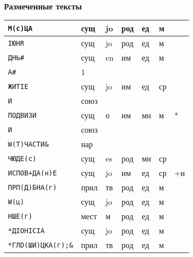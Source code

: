 \begin{frame}
  \frametitle{Размеченные тексты}

  \footnotesize \setlength{\aboverulesep}{0.5pt} \setlength{\belowrulesep}{0.5pt}
  \begin{tabularx}{\textwidth}{Xp{0.75cm}p{0.75cm}p{0.75cm}p{0.75cm}p{0.75cm}p{0.75cm}}
    \toprule
    \texttt{М(с)ЦА} & сущ  & jo & род & ед & м  &    \\ \midrule
    \texttt{IЮНR} & сущ  & jo & род & ед & м  &    \\ \midrule
    \texttt{ДНЬ\#} & сущ  & en & им  & ед & м  &    \\ \midrule
    \texttt{А\#} & 1    &    &     &    &    &    \\ \midrule
    \texttt{ЖИТIЕ} & сущ  & jo & им  & ед & ср &    \\ \midrule
    \texttt{И} & союз &    &     &    &    &    \\ \midrule
    \texttt{ПОДВИЗИ} & сущ  & о  & им  & мн & м  & *  \\ \midrule
    \texttt{И} & союз &    &     &    &    &    \\ \midrule
    \texttt{W(Т)ЧАСТИ\&} & нар  &    &     &    &    &    \\ \midrule
    \texttt{ЧЮДЕ(с)} & сущ  & es & род & мн & ср &    \\ \midrule
    \texttt{ИСПОВ+ДА(н)Е} & сущ  & jo & им  & ед & ср & +и \\ \midrule
    \texttt{ПРП(Д)БНА(г)} & прил & тв & род & ед & м  &    \\ \midrule
    \texttt{W(ц)} & сущ  & jo & род & ед & м  &    \\ \midrule
    \texttt{НШЕ(г)} & мест & м  & род & ед & м  &    \\ \midrule
    \texttt{*ДIОНIСIА} & сущ  & jo & род & ед & м  &    \\ \midrule
    \texttt{*ГЛD(ШИ)ЦКА(г);\&} & прил & тв & род & ед & м  &    \\ \bottomrule
  \end{tabularx}
\end{frame}

